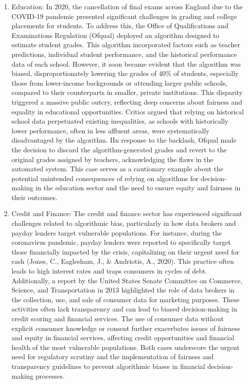 \documentclass[10pt]{article}
\begin{document}
\begin{enumerate}
    \item Education: In 2020, the cancellation of final exams across England due to the COVID-19 pandemic presented significant challenges in grading and college placements for students. To address this, the Office of Qualifications and Examinations Regulation (Ofqual) deployed an algorithm designed to estimate student grades. This algorithm incorporated factors such as teacher predictions, individual student performance, and the historical performance data of each school. However, it soon became evident that the algorithm was biased, disproportionately lowering the grades of 40\% of students, especially those from lower-income backgrounds or attending larger public schools, compared to their counterparts in smaller, private institutions. This disparity triggered a massive public outcry, reflecting deep concerns about fairness and equality in educational opportunities. Critics argued that relying on historical school data perpetuated existing inequalities, as schools with historically lower performance, often in less affluent areas, were systematically disadvantaged by the algorithm. IIn response to the backlash, Ofqual made the decision to discard the algorithm-generated grades and revert to the original grades assigned by teachers, acknowledging the flaws in the automated system. This case serves as a cautionary example about the potential unintended consequences of relying on algorithms for decision-making in the education sector and the need to ensure equity and fairness in their outcomes.
    \item Credit and Finance: The credit and finance sector has experienced significant challenges related to algorithmic bias, particularly in how data brokers and payday lenders target vulnerable populations. For instance, during the coronavirus pandemic, payday lenders were reported to specifically target those financially impacted by the crisis, capitalizing on their urgent need for cash (Jones, C., Eaglesham, J., \& Andriotis, A., 2020). This practice often leads to high interest rates and traps consumers in cycles of debt. Additionally, a report by the United States Senate Committee on Commerce, Science, and Transportation in 2013 highlighted the role of data brokers in the collection, use, and sale of consumer data for marketing purposes. These activities often lack transparency and can lead to biased decision-making in credit scoring and financial services. The use of consumer data without explicit consumer knowledge or consent further exacerbates issues of fairness and equity in financial services, affecting credit opportunities and financial health of the most vulnerable populations. Both cases underscore the urgent need for regulatory scrutiny and the implementation of fairness and transparency guidelines to prevent algorithmic biases in financial decision-making processes.

\end{enumerate}
\end{document}
